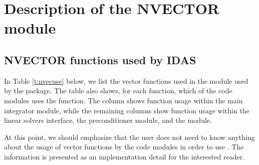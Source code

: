 \chapter{Description of the NVECTOR module}\label{s:nvector}



\section{NVECTOR functions used by IDAS}

In Table \ref{t:nvecuse} below, we list the vector functions used in the
{\nvector} module used by the {\idas} package.
The table also shows, for each function, which of the code modules uses
the function. The {\idas} column shows function usage within the main
integrator module, while the remaining columns show function usage
within the {\idas} linear solvers interface, the {\idabbdpre}
preconditioner module, and the {\idaa} module.

At this point, we should emphasize that the {\idas} user does not need to know
anything about the usage of vector functions by the {\idas} code modules in order
to use {\idas}. The information is presented as an implementation detail for the
interested reader.

